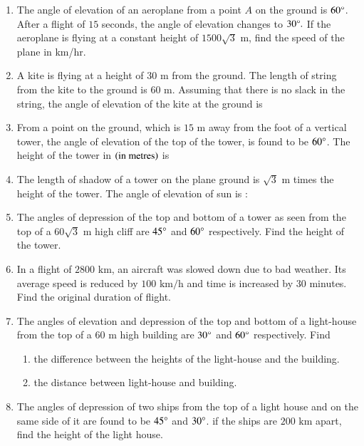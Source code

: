 \begin{enumerate}[label=\thesubsection.\arabic*.,ref=\thesubsection.\theenumi]
\begin{figure}[h!]
	\caption{}
	\label{Figure 1}
\end{figure}
\hfill{}\item The angle of elevation of an aeroplane from a point $A$ on the ground is $60 \degree  $. After a flight of $15$ seconds, the angle of elevation changes to $  30 \degree.$ If the aeroplane is flying at a constant height of $1500\sqrt{3}$ m, find the speed of the plane in km/hr.
\hfill{}
\item A kite is flying at a height of $30 \text{ m}$ from the ground. The length of string from the kite to the ground is $60 \text{ m}$. Assuming that there is no slack in the string, the angle of elevation of the kite at the ground is 
\hfill{}\item From a point on the ground, which is $15\text{ m}$ away from the foot of a vertical tower, the angle of elevation of the top of the tower, is found to be $60\degree$. The height of the tower in $\left(\text{in metres}\right)$ is 
\hfill{}\item The length of shadow of a tower on the plane ground is $\sqrt 3 \text{ m}$ times the height of the tower. The angle of elevation of sun is : 
\hfill{}\item The angles of depression of the top and bottom of a tower as seen from the top of a $60\sqrt 3 \text{ m}$ high cliff are $45\degree$ and $60\degree$ respectively. Find the height of the tower. 
\hfill{}\item In a flight of $2800 \text{ km}$, an aircraft was slowed down due to bad weather. Its average speed is reduced by $100 \text{ km/h}$ and time is increased by $30$ minutes. Find the original duration of flight. 
\hfill{}\item The angles of elevation and depression of the top and bottom of a light-house from the top of a $60 \text{ m}$ high building are $30\degree$ and $60\degree$ respectively. Find 
\begin{enumerate}
\item the difference between the heights of the light-house and the building. 
\item the distance between light-house and building. 
\end{enumerate}
\hfill{}\item The angles of depression of two ships from the top of a light house and on the same side of it are found to be $45\degree$ and $30\degree$. if the ships are $200 \text{ km}$ apart, find the height of the light house. 

\end{enumerate}

